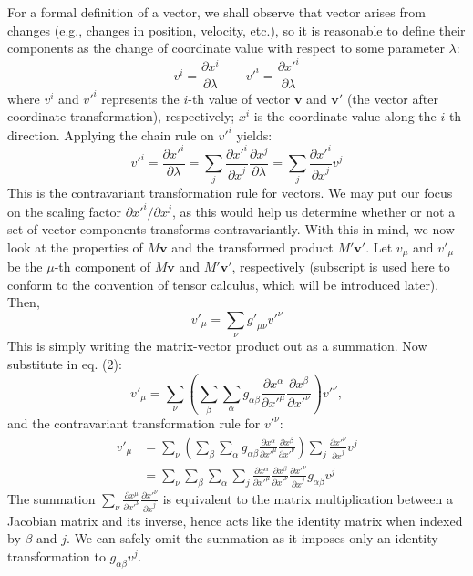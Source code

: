 \documentclass[conference]{IEEEtran}
\begin{document}
For a formal definition of a vector, we shall observe that vector arises from changes 
(e.g., changes in position, velocity, etc.), so it is reasonable to define 
their components as the change of coordinate value with respect to some parameter $\lambda$:
\[
v^i = \frac{\partial x^i}{\partial \lambda} \quad\quad
v'^i = \frac{\partial x'^i}{\partial \lambda}
\]
where $v^i$ and $v'^i$ represents the $i$-th value of vector $\mathbf{v}$ and $\mathbf{v'}$
(the vector after coordinate transformation), respectively; $x^i$ is the coordinate value along 
the $i$-th direction. Applying the chain rule on $v'^i$ yields:
\[
{v'}^i=\frac{\partial{x'}^i}{\partial\lambda}
=\sum_{j}{\frac{\partial{x'}^i}{{\partial x}^j}\frac{\partial x^j}{\partial\lambda}}
=\sum_{j}{\frac{\partial{x'}^i}{{\partial x}^j}v^j}
\tag{3}
\]
This is the contravariant transformation rule for vectors. We may put 
our focus on the scaling factor $\partial{x'}^i/\partial x^j$, as this 
would help us determine whether or not a set of vector components transforms 
contravariantly. With this in mind, we now look at the properties of $M \mathbf{v}$ 
and the transformed product $M' \mathbf{v}'$. Let $v_\mu$ and $v'_\mu$ be the $\mu$-th 
component of $M \mathbf{v}$ and $M' \mathbf{v}'$, respectively (subscript is used here 
to conform to the convention of tensor calculus, which will be introduced later). Then,
\[
v'_\mu = \sum_{\nu}{{g'}_{\mu\nu}{v'}^\nu}
\]
This is simply writing the matrix-vector product out as a summation. Now substitute in 
eq. (2):
\[
v'_\mu = \sum_{\nu}
\left(\sum_{\beta} 
\sum_{\alpha} g_{\alpha\beta} \frac{\partial x^\alpha}{\partial x'^\mu} 
\frac{\partial x^\beta}{\partial x'^\nu}\right)
v'^\nu,
\]
and the contravariant transformation rule for $v'^\nu$:
\begin{align*}
v'_\mu &= \sum_{\nu}
\left(\sum_{\beta} 
\sum_{\alpha} g_{\alpha\beta} \frac{\partial x^\alpha}{\partial x'^\mu} 
\frac{\partial x^\beta}{\partial x'^\nu}\right)
\sum_{j}{\frac{\partial{x'}^\nu}{{\partial x}^j}v^j} \\
&=
\sum_{\nu} \sum_{\beta} 
\sum_{\alpha} \sum_{j} \frac{\partial x^\alpha}{\partial x'^\mu} 
\frac{\partial x^\beta}{\partial x'^\nu}
\frac{\partial{x'}^\nu}{{\partial x}^j}
g_{\alpha\beta} v^j
\end{align*}
The summation 
$\sum_{\nu}\frac{\partial x^\mu}{{\partial x'}^\nu}\frac{\partial{x'}^\nu}{{\partial x}^j}$
is equivalent to the matrix multiplication between a Jacobian matrix and its inverse, 
hence acts like the identity matrix when indexed by $\beta$ and $j$. We can safely 
omit the summation as it imposes only an identity transformation to $g_{\alpha\beta} v^j$.
\end{document}

